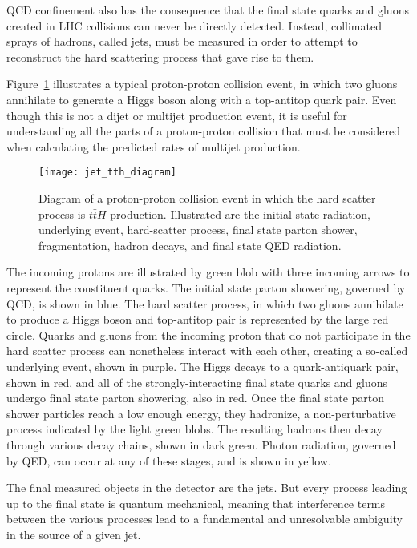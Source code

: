 QCD confinement also has the consequence that the final state quarks and gluons created in LHC collisions
can never be directly detected.
Instead, collimated sprays of hadrons, called jets, must be measured in order to attempt to reconstruct the
hard scattering process that gave rise to them.

Figure~\ref{fig:jet_tth_diagram} illustrates a typical proton-proton collision event,
in which two gluons annihilate to generate a Higgs boson along with a top-antitop quark pair.
Even though this is not a dijet or multijet production event,
it is useful for understanding all the parts of a proton-proton collision that must be considered when calculating the
predicted rates of multijet production.

\begin{figure}[h!]
    \centering
\texttt{[image: jet\_tth\_diagram]}
\caption{Diagram of a proton-proton collision event in which the hard scatter process is $t\bar{t}H$ production.
Illustrated are the initial state radiation, underlying event, hard-scatter process, final state parton shower,
fragmentation, hadron decays, and final state QED radiation.}
\label{fig:jet_tth_diagram}
\end{figure}\cite{sherpa-2004}

The incoming protons are illustrated by green blob with three incoming arrows to represent the constituent quarks.
The initial state parton showering, governed by QCD, is shown in blue.
The hard scatter process, in which two gluons annihilate to produce a Higgs boson and top-antitop pair is represented
by the large red circle.
Quarks and gluons from the incoming proton that do not participate in the hard scatter process can nonetheless interact
with each other, creating a so-called underlying event, shown in purple.
The Higgs decays to a quark-antiquark pair, shown in red, and all of the strongly-interacting final state quarks
and gluons undergo final state parton showering, also in red.
Once the final state parton shower particles reach a low enough energy, they hadronize, a non-perturbative process
indicated by the light green blobs.
The resulting hadrons then decay through various decay chains, shown in dark green.
Photon radiation, governed by QED, can occur at any of these stages, and is shown in yellow.

The final measured objects in the detector are the jets.
But every process leading up to the final state is quantum mechanical,
meaning that interference terms between the various processes lead to a fundamental and unresolvable ambiguity in the source of a given jet.

